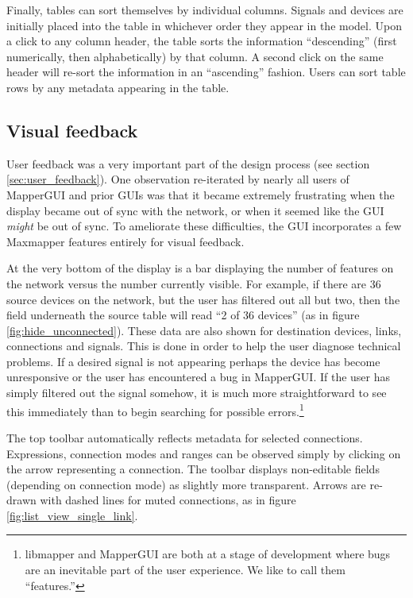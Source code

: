Finally, tables can sort themselves by individual columns. Signals and devices are initially placed into the table in whichever order they appear in the model. Upon a click to any column header, the table sorts the information ``descending'' (first numerically, then alphabetically) by that column. A second click on the same header will re-sort the information in an ``ascending'' fashion. Users can sort table rows by any metadata appearing in the table.


	\subsection{Visual feedback} %
	\label{sub:visual_feedback}

User feedback was a very important part of the design process (see section \ref{sec:user_feedback}). One observation re-iterated by nearly all users of MapperGUI and prior GUIs was that it became extremely frustrating when the display became out of sync with the network, or when it seemed like the GUI \emph{might} be out of sync. To ameliorate these difficulties, the GUI incorporates a few Maxmapper features entirely for visual feedback.
		
At the very bottom of the display is a bar displaying the number of features on the network versus the number currently visible. For example, if there are 36 source devices on the network, but the user has filtered out all but two, then the field underneath the source table will read ``2 of 36 devices'' (as in figure \ref{fig:hide_unconnected}). These data are also shown for destination devices, links, connections and signals. This is done in order to help the user diagnose technical problems. If a desired signal is not appearing perhaps the device has become unresponsive or the user has encountered a bug in MapperGUI. If the user has simply filtered out the signal somehow, it is much more straightforward to see this immediately than to begin searching for possible errors.\footnote{libmapper and MapperGUI are both at a stage of development where bugs are an inevitable part of the user experience. We like to call them ``features.''}

The top toolbar automatically reflects metadata for selected connections. Expressions, connection modes and ranges can be observed simply by clicking on the arrow representing a connection. The toolbar displays non-editable fields (depending on connection mode) as slightly more transparent. Arrows are re-drawn with dashed lines for muted connections, as in figure \ref{fig:list_view_single_link}.

